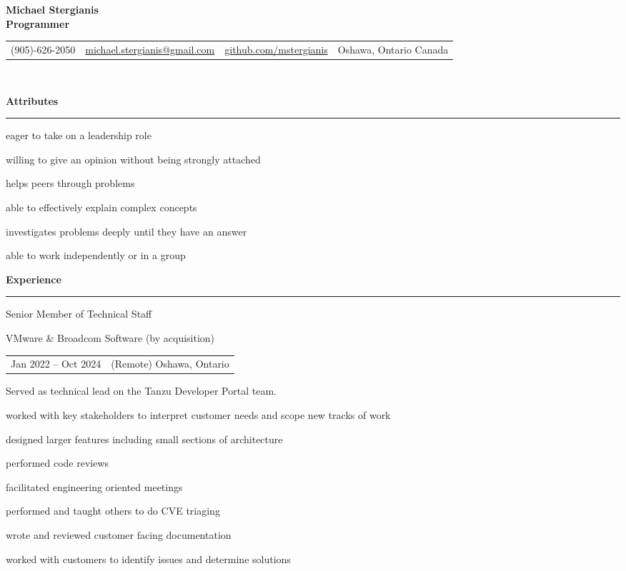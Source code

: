 \documentclass[letterpaper]{article}
\makeatletter
\newcommand{\primary}{\color{primary}}
\newcommand{\primarydark}{\color{primarydark}}
\newcommand{\complementary}{\color{complementary}}
\newcommand{\mapMarker}{\faMapMarker*[alt]}
\newcommand{\email}
{\faEnvelope \space \href{mailto:michaelstergianis@gmail.com}{michael.stergianis@gmail.com}}
\newcommand{\github}
{\faGithub \space \href{https://github.com/mstergianis}{github.com/mstergianis}}
\newcommand{\phone}
{\faPhone \space (905)-626-2050}
\newcommand{\location}
{\mapMarker \space Oshawa, Ontario Canada}
\newenvironment{heading}[1]{%
  {\LARGE \primarydark \textbf{#1}}\\ {\complementary
    \rule[5pt]{\linewidth}{0.6pt}}
}
{\par\vspace{8pt}}
\newenvironment{experience}[4]{
  { #1 \par}
  {\small \primary #2 \par}
  \begin{tabularx}{\linewidth}{ l l }
    { \small \faCalendar \space #3 } & { \small \mapMarker \space #4 }
  \end{tabularx}%
}{
  \vspace{8pt}
}
\newenvironment{itemize*}%
{\begin{itemize}[topsep=0pt,leftmargin=20pt]%
    \setlength{\itemsep}{0pt}%
    \setlength{\parsep}{0pt}%
    \setlength{\parskip}{0pt}%
    \small%
  }%
  {\end{itemize}}
\makeatother
\begin{document}
{\huge \textbf{Michael Stergianis}}\\
{\large \primary \textbf{Programmer}}
\\

\begin{tabularx}{\linewidth}{ l l l l }
  \phone & \email & \github & \location \\
\end{tabularx}\\

\begin{minipage}[t]{0.58\textwidth}%
  \begin{heading}{Attributes}
    \begin{itemize*}
    \item eager to take on a leadership role
    \item willing to give an opinion without being strongly attached
    \item helps peers through problems
    \item able to effectively explain complex concepts
    \item investigates problems deeply until they have an answer
    \item able to work independently or in a group
    \end{itemize*}
  \end{heading}
  \begin{heading}{Experience}%
    \begin{experience}{Senior Member of Technical Staff}
      {VMware \& Broadcom Software (by acquisition)}
      {Jan 2022 -- Oct 2024}
      {(Remote) Oshawa, Ontario}
      Served as technical lead on the Tanzu Developer Portal team.
      \begin{itemize*}
      \item worked with key stakeholders to interpret customer needs and scope
        new tracks of work
      \item designed larger features including small sections of architecture
      \item performed code reviews
      \item facilitated engineering oriented meetings
      \item performed and taught others to do CVE triaging
      \item wrote and reviewed customer facing documentation
      \item worked with customers to identify issues and determine solutions
      \end{itemize*}

\end{experience}
\end{heading}
\end{minipage}
\end{document}
